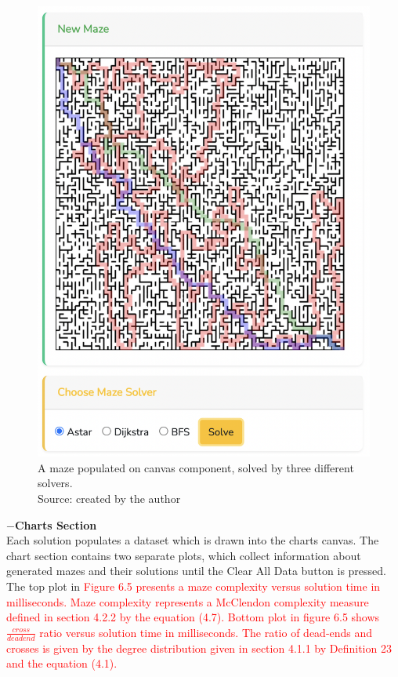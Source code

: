 \begin{figure}[!h]
    \centering
    \centering
    \includegraphics[scale =0.35 ]{mazeSolutions}
    \caption{A maze populated on canvas component, solved by three different solvers.\\Source: created by the author}
    \end{figure}
\newpage
\textbf{$-$Charts Section}\\
Each solution populates a dataset which is drawn into the charts canvas. The chart section contains two separate plots, which collect information about 
generated mazes and their solutions until the Clear All Data button is pressed. The top plot in \textcolor{red}{Figure 6.5 presents a maze complexity versus solution time in milliseconds.
Maze complexity represents a McClendon complexity measure defined in section 4.2.2 by the equation (4.7). Bottom plot in figure 6.5 shows $\frac{cross}{deadend}$
ratio versus solution time in milliseconds. The ratio of dead-ends and crosses is given by the degree distribution given in section 4.1.1 by Definition 23 and the equation (4.1).}\\
